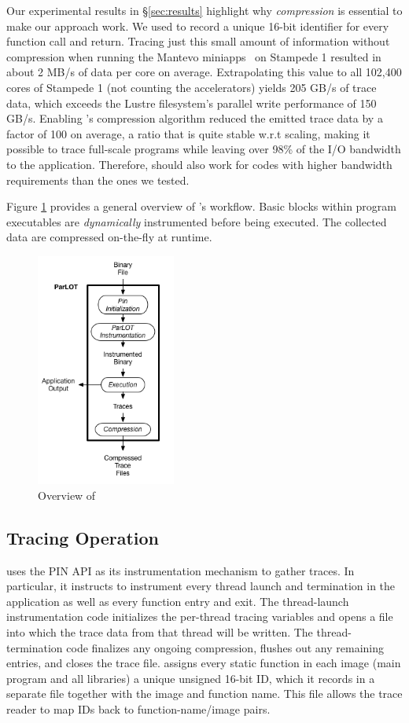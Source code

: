 Our experimental results in \S\ref{sec:results} highlight why \textit{compression} is essential to make our approach work.
%
We used \parlot to record a unique 16-bit identifier for every function call and return.
%
Tracing just this small amount of information without compression when running the Mantevo miniapps~\cite{mantevo} on Stampede 1 resulted in about 2 MB/s of data per core on average.
%
Extrapolating this value to all 102,400 cores of Stampede 1 (not counting the accelerators) yields 205 GB/s of trace data, which exceeds the Lustre filesystem's parallel write performance of 150 GB/s.
%
Enabling \parlot's compression algorithm reduced the emitted trace data by a factor of 100 on average, a ratio that is quite stable w.r.t scaling, making it possible to trace full-scale programs while leaving over 98\% of the I/O bandwidth to the application. Therefore, \parlot should also work for codes with higher bandwidth requirements than the ones we tested.

Figure \ref{overview} provides a general overview of \parlot 's workflow.
%
Basic blocks within program executables are {\em dynamically} instrumented before being executed. The collected data are compressed on-the-fly at runtime. 
%

\begin{figure}[!t]
\centering
\includegraphics[width=1.8in]{overview3.png}
\caption{Overview of \parlot}
\label{overview}
\end{figure}


\subsection{Tracing Operation}
\label{subsec:traceOp}

\parlot uses the PIN API as its instrumentation mechanism to gather traces. In particular, it instructs \pin to instrument every thread launch and termination in the application as well as every function entry and exit. The thread-launch instrumentation code initializes the per-thread tracing variables and opens a file into which the trace data from that thread will be written. The thread-termination code finalizes any ongoing compression, flushes out any remaining entries, and closes the trace file. \parlot assigns every static function in each image (main program and all libraries) a unique unsigned 16-bit ID, which it records in a separate file together with the image and function name. This file allows the trace reader to map IDs back to function-name/image pairs.

